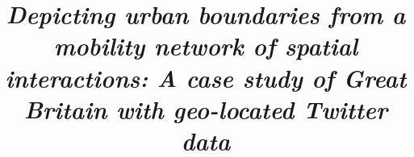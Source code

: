 \documentclass[]{tGIS2e}
\begin{document}



\title{{\itshape Depicting urban boundaries from a mobility network of spatial interactions: A case study of Great Britain with geo-located Twitter data} }
\maketitle
\end{document}
